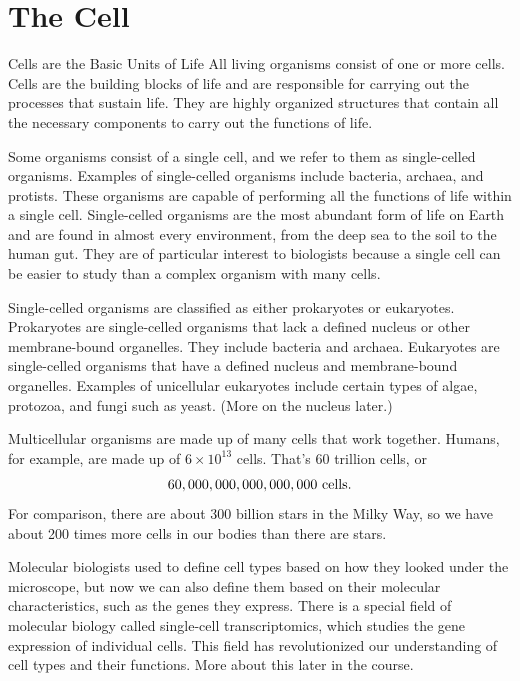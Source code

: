 \section{The Cell}

Cells are the Basic Units of Life
All living organisms consist of one or more cells. Cells are the building blocks of life and are responsible for carrying out the processes that sustain life. They are highly organized structures that contain all the necessary components to carry out the functions of life. 

Some organisms consist of a single cell, and we refer to them as single-celled organisms. Examples of single-celled organisms include bacteria, archaea, and protists. These organisms are capable of performing all the functions of life within a single cell. Single-celled organisms are the most abundant form of life on Earth and are found in almost every environment, from the deep sea to the soil to the human gut. They are of particular interest to biologists because a single cell can be easier to study than a complex organism with many cells. 

Single-celled organisms are classified as either prokaryotes or eukaryotes. Prokaryotes are single-celled organisms that lack a defined nucleus or other membrane-bound organelles. They include bacteria and archaea. Eukaryotes are single-celled organisms that have a defined nucleus and membrane-bound organelles. Examples of unicellular eukaryotes include certain types of algae, protozoa, and fungi such as yeast. (More on the nucleus later.)

Multicellular organisms are made up of many cells that work together. Humans, for example, are made up of \(6 \times 10^{13}\) cells. That's 60 trillion cells, or
$$ 60,000,000,000,000,000 {\ \rm cells}. $$
For comparison, there are about 300 billion stars in the Milky Way, so we have about 200 times more cells in our bodies than there are stars.

Molecular biologists used to define cell types based on how they looked under the microscope, but now we can also define them based on their molecular characteristics, such as the genes they express. There is a special field of molecular biology called single-cell transcriptomics, which studies the gene expression of individual cells. This field has revolutionized our understanding of cell types and their functions. More about this later in the course.

